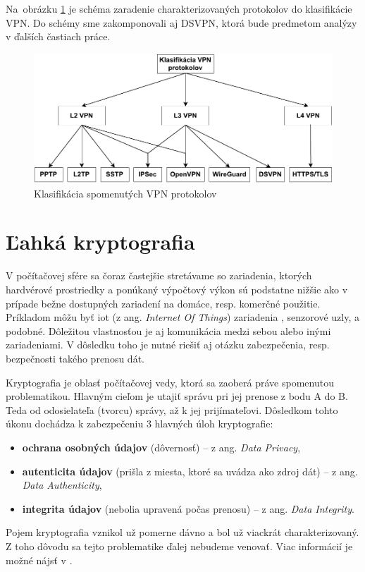 Na~obrázku \ref{vpnklas2} je schéma zaradenie charakterizovaných protokolov do klasifikácie VPN. Do schémy sme zakomponovali aj DSVPN, ktorá bude predmetom analýzy v ďalších častiach práce.

\begin{figure} [!h]
	\centering
	\includegraphics[width=\textwidth]{figures/vpnklas2}
	\caption{Klasifikácia spomenutých VPN protokolov}
	\label{vpnklas2}
\end{figure}

\chapter{Ľahká kryptografia}\label{krypto}
V počítačovej sfére sa čoraz častejšie stretávame so zariadenia, ktorých hardvérové prostriedky a ponúkaný výpočtový výkon sú podstatne nižšie ako v prípade bežne dostupných zariadení na domáce, resp. komerčné použitie. Príkladom môžu byť \acrshort{iot} (z ang. \textit{Internet Of Things}) zariadenia , senzorové uzly, a podobné. Dôležitou vlastnosťou je aj komunikácia medzi sebou alebo inými zariadeniami. V dôsledku toho je nutné riešiť aj otázku zabezpečenia, resp. bezpečnosti takého prenosu dát. 

Kryptografia je oblasť počítačovej vedy, ktorá sa zaoberá práve spomenutou problematikou. Hlavným cieľom je utajiť správu pri jej prenose z bodu A do B. Teda od odosielateľa (tvorcu) správy, až k jej prijímateľovi. Dôsledkom tohto úkonu dochádza k zabezpečeniu 3 hlavných úloh kryptografie:
\begin{itemize}
	\item \textbf{ochrana osobných údajov} (dôvernosť) -- z ang. \textit{Data Privacy}, 
	\item \textbf{autenticita údajov} (prišla z miesta, ktoré sa uvádza ako zdroj dát)  -- z ang. \textit{Data Authenticity},
	\item \textbf{integrita údajov} (nebolia upravená počas prenosu)  -- z ang. \textit{Data Integrity}.
\end{itemize} 
Pojem kryptografia vznikol už pomerne dávno a bol už viackrát charakterizovaný. Z toho dôvodu sa tejto problematike ďalej nebudeme venovať. Viac informácií je možné nájsť v \cite{levicky}. 

